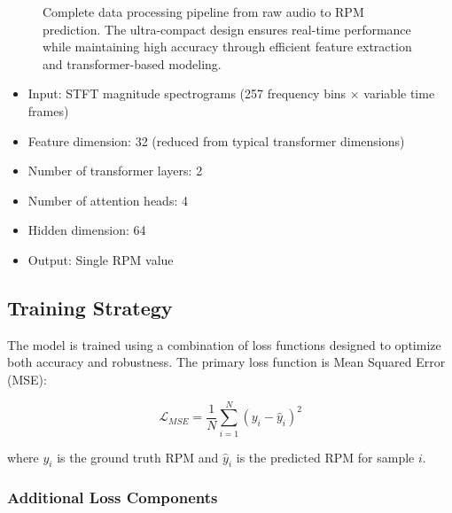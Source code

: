 \documentclass[journal,10pt]{IEEEtran}
\begin{document}
\begin{figure}[!ht]
\caption{Complete data processing pipeline from raw audio to RPM prediction. The ultra-compact design ensures real-time performance while maintaining high accuracy through efficient feature extraction and transformer-based modeling.}
\label{fig:processing_pipeline}
\end{figure}

\begin{itemize}
    \item Input: STFT magnitude spectrograms (257 frequency bins × variable time frames)
    \item Feature dimension: 32 (reduced from typical transformer dimensions)
    \item Number of transformer layers: 2
    \item Number of attention heads: 4
    \item Hidden dimension: 64
    \item Output: Single RPM value
\end{itemize}

\subsection{Training Strategy}

The model is trained using a combination of loss functions designed to optimize both accuracy and robustness. The primary loss function is Mean Squared Error (MSE):

\begin{equation}
\mathcal{L}_{MSE} = \frac{1}{N} \sum_{i=1}^{N} (y_i - \hat{y}_i)^2
\end{equation}

where $y_i$ is the ground truth RPM and $\hat{y}_i$ is the predicted RPM for sample $i$.

\subsubsection{Additional Loss Components}
\end{document}
